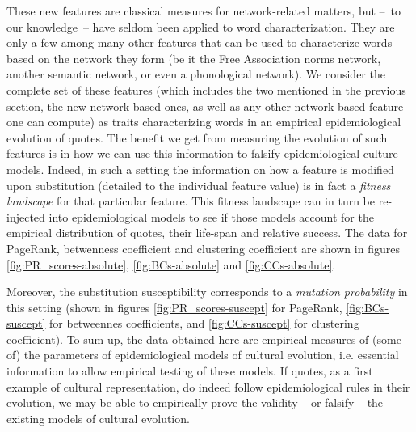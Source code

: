 These new features are classical measures for network-related matters, but --~to our knowledge~-- have seldom been applied to word characterization. They are only a few among many other features that can be used to characterize words based on the network they form (be it the Free Association norms network, another semantic network, or even a phonological network). We consider the complete set of these features (which includes the two mentioned in the previous section, the new network-based ones, as well as any other network-based feature one can compute) as traits characterizing words in an empirical epidemiological evolution of quotes. The benefit we get from measuring the evolution of such features is in how we can use this information to falsify epidemiological culture models. Indeed, in such a setting the information on how a feature is modified upon substitution (detailed to the individual feature value) is in fact a \emph{fitness landscape} for that particular feature. This fitness landscape can in turn be re-injected into epidemiological models to see if those models account for the empirical distribution of quotes, their life-span and relative success. The data for PageRank, betwenness coefficient and clustering coefficient are shown in figures \ref{fig:PR_scores-absolute}, \ref{fig:BCs-absolute} and \ref{fig:CCs-absolute}.



Moreover, the substitution susceptibility corresponds to a \emph{mutation probability} in this setting (shown in figures \ref{fig:PR_scores-suscept} for PageRank, \ref{fig:BCs-suscept} for betweennes coefficients, and \ref{fig:CCs-suscept} for clustering coefficient). To sum up, the data obtained here are empirical measures of (some of) the parameters of epidemiological models of cultural evolution, i.e. essential information to allow empirical testing of these models. If quotes, as a first example of cultural representation, do indeed follow epidemiological rules in their evolution, we may be able to empirically prove the validity -- or falsify -- the existing models of cultural evolution.


